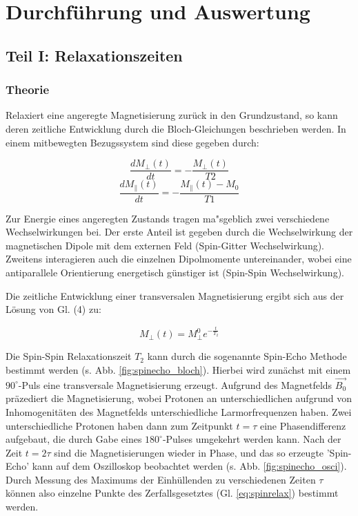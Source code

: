 \documentclass[a4paper]{scrartcl} %
\begin{document}
\section{Durchführung und Auswertung}

\subsection{Teil I: Relaxationszeiten}

\subsubsection{Theorie}

Relaxiert eine angeregte Magnetisierung zurück in den Grundzustand, so kann deren zeitliche Entwicklung durch die Bloch-Gleichungen beschrieben werden. In einem mitbewegten Bezugssystem sind diese gegeben durch:

\begin{equation}
\frac{dM_{\perp}(t)}{dt} = - \frac{M_{\perp}(t)}{T2}
\end{equation}
\begin{equation}
\frac{dM_{\parallel}(t)}{dt} = - \frac{M_{\parallel}(t) - M_0}{T1}
\end{equation}

Zur Energie eines angeregten Zustands tragen ma"sgeblich zwei verschiedene Wechselwirkungen bei. Der erste Anteil ist gegeben durch die Wechselwirkung der magnetischen Dipole mit dem externen Feld (Spin-Gitter Wechselwirkung). Zweitens interagieren auch die einzelnen Dipolmomente untereinander, wobei eine antiparallele Orientierung energetisch günstiger ist (Spin-Spin Wechselwirkung).

Die zeitliche Entwicklung einer transversalen Magnetisierung ergibt sich aus der Lösung von Gl. (4) zu:

\begin{equation}
M_{\perp}(t) = M_{\perp}^0 e^{-\frac{t}{T_2}}
\label{eq:spinrelax}
\end{equation}

Die Spin-Spin Relaxationszeit $T_2$ kann durch die sogenannte Spin-Echo Methode bestimmt werden (s. Abb. \ref{fig:spinecho_bloch}). Hierbei wird zunächst mit einem $90^\circ$-Puls eine transversale Magnetisierung erzeugt. Aufgrund des Magnetfelds $\vec{B_0}$ präzediert die Magnetisierung, wobei Protonen an unterschiedlichen aufgrund von Inhomogenitäten des Magnetfelds unterschiedliche Larmorfrequenzen haben. Zwei unterschiedliche Protonen haben dann zum Zeitpunkt $t=\tau$ eine Phasendifferenz aufgebaut, die durch Gabe eines $180^\circ$-Pulses umgekehrt werden kann. Nach der Zeit $t=2\tau$ sind die Magnetisierungen wieder in Phase, und das so erzeugte 'Spin-Echo' kann auf dem Oszilloskop beobachtet werden (s. Abb. \ref{fig:spinecho_osci}). Durch Messung des Maximums der Einhüllenden zu verschiedenen Zeiten $\tau$ können also einzelne Punkte des Zerfallsgesetztes (Gl. \ref{eq:spinrelax}) bestimmt werden.
\end{document}
